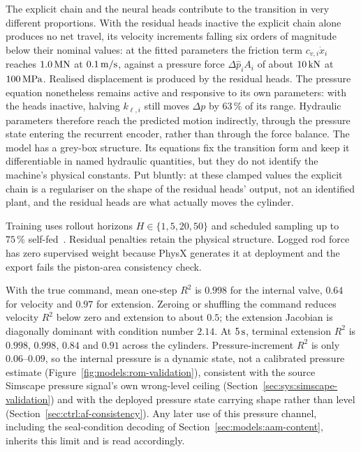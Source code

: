 The explicit chain and the neural heads contribute to the transition in very
different proportions. With the residual heads inactive the explicit chain
alone produces no net travel, its velocity increments falling six orders of
magnitude below their nominal values: at the fitted parameters the friction
term $c_{v,i}\dot{x}_i$ reaches $\unit[1.0]{MN}$ at $\unit[0.1]{m/s}$, against
a pressure force $\Delta\hat{p}_{i}A_i$ of about $\unit[10]{kN}$ at
$\unit[100]{MPa}$. Realised displacement is produced by the residual heads.
The pressure equation nonetheless remains active and responsive to its own
parameters: with the heads inactive, halving $k_{\ell,i}$ still moves
$\Delta p$ by $63\,\%$ of its range. Hydraulic parameters therefore reach the
predicted motion indirectly, through the pressure state entering the recurrent
encoder, rather than through the force balance. The model has a grey-box
structure. Its equations fix the transition form and keep it differentiable in
named hydraulic quantities, but they do not identify the machine's physical
constants. Put bluntly: at these clamped values the explicit chain is a
regulariser on the shape of the residual heads' output, not an identified
plant, and the residual heads are what actually moves the cylinder.

Training uses rollout horizons $H\in\{1,5,20,50\}$ and scheduled sampling up to
$75\,\%$ self-fed~\cite{bengio2015scheduled}. Residual penalties retain the
physical structure. Logged rod force has zero supervised weight because PhysX
generates it at deployment and the export fails the piston-area consistency
check.

With the true command, mean one-step $R^2$ is $0.998$ for the internal valve,
$0.64$ for velocity and $0.97$ for extension. Zeroing or shuffling the command
reduces velocity $R^2$ below zero and extension to about $0.5$; the extension
Jacobian is diagonally dominant with condition number $2.14$. At
$\unit[5]{s}$, terminal extension $R^2$ is $0.998$, $0.998$, $0.84$ and $0.91$
across the cylinders. Pressure-increment $R^2$ is only $0.06$--$0.09$, so the
internal pressure is a dynamic state, not a calibrated pressure estimate
(Figure~\ref{fig:models:rom-validation}), consistent with the source
Simscape pressure signal's own wrong-level ceiling
(Section~\ref{sec:sys:simscape-validation}) and with the deployed pressure
state carrying shape rather than level
(Section~\ref{sec:ctrl:af-consistency}). Any later use of this pressure
channel, including the seal-condition decoding of
Section~\ref{sec:models:aam-content}, inherits this limit and is read
accordingly.

